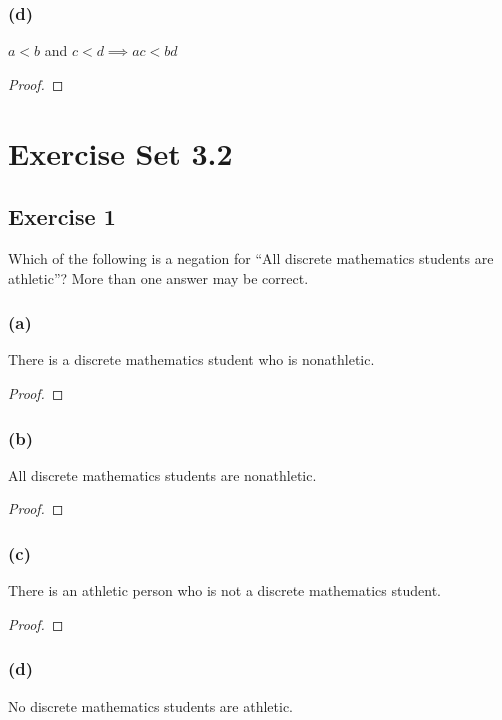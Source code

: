 \documentclass[14pt]{extarticle}
\begin{document}
\subsubsection{(d)}
$a < b$ and $c < d \implies ac < bd$

\begin{proof}

\end{proof}

\section{Exercise Set 3.2}

\subsection{Exercise 1}
Which of the following is a negation for “All discrete mathematics students are athletic”? More than one answer may be correct.

\subsubsection{(a)}
There is a discrete mathematics student who is nonathletic.

\begin{proof}

\end{proof}

\subsubsection{(b)}
All discrete mathematics students are nonathletic.

\begin{proof}

\end{proof}

\subsubsection{(c)}
There is an athletic person who is not a discrete mathematics student.

\begin{proof}

\end{proof}

\subsubsection{(d)}
No discrete mathematics students are athletic.
\end{document}
